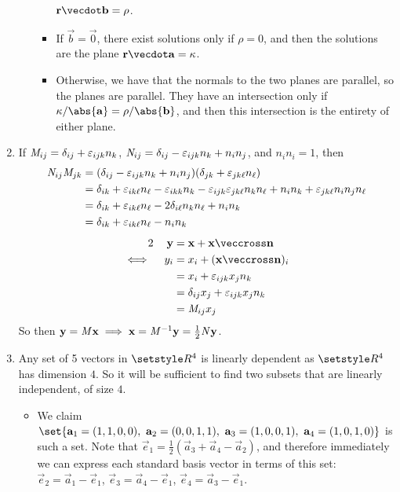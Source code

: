 \documentclass[fleqn,a4paper,11pt]{article}
\begin{document}
\begin{enumerate}[label=\textbf{\arabic*.}]
\begin{enumerate}[label=(\alph*)]
\begin{itemize}
       \(\vec r \vecdot \vec b = \rho\).
      \item
       If \(\vec b = \vec 0\), there exist solutions only if
       \(\rho = 0\), and then the solutions are the plane
       \(\vec r \vecdot \vec a = \kappa\).
      \item
       Otherwise, we have that the normals to the two planes are parallel, so
       the planes are parallel. They have an intersection only if
       \(\kappa / \abs{\vec a} = \rho / \abs{\vec b}\), and then this
       intersection is the entirety of either plane.
     \end{itemize}
   \end{enumerate}
  \item
   If \(\mathit{M}_{ij} = \delta_{ij} + \varepsilon_{ijk} n_k\),
   \(\mathit{N}_{ij} = \delta_{ij} - \varepsilon_{ijk} n_k + n_i n_j\), and
   \(n_i n_i = 1\), then
   \begin{align*}
    \mathit{N}_{ij} \mathit{M}_{jk}
     &= (\delta_{ij} - \varepsilon_{ijk} n_k + n_i n_j)
        (\delta_{jk} + \varepsilon_{jk\ell} n_\ell) \\
     &= \delta_{ik} + \varepsilon_{ik\ell} n_\ell
        - \varepsilon_{ikk} n_k - \varepsilon_{ijk} \varepsilon_{jk\ell} n_k n_\ell
        + n_i n_k + \varepsilon_{jk\ell} n_i n_j n_\ell \\
     &= \delta_{ik} + \varepsilon_{ik\ell} n_\ell
        - 2\delta_{i\ell} n_k n_\ell + n_i n_k \\
     &= \delta_{ik} + \varepsilon_{ik\ell} n_\ell - n_i n_k \\
   \end{align*}
   \begin{alignat*}2
    && \vec y &= \vec x + \vec x \veccross \vec n \\
    \iff{}&& y_i &= x_i + (\vec x \veccross \vec n)_i \\
    &&           &= x_i + \epsilon_{ijk} x_j n_k \\
    &&           &= \delta_{ij} x_j + \epsilon_{ijk} x_j n_k \\
    &&           &= \mat M_{ij} x_j
   \end{alignat*}
   So then \(\mathrm{\mathbf{y}} = \mathit{M} \mathrm{\mathbf{x}} \implies
    \mathrm{\mathbf{x}} = \mathit{M}^{-1} \mathrm{\mathbf{y}} = \frac 12 \mathit{N} \mathrm{\mathbf{y}}\).
   \item
    Any set of 5 vectors in \(\Reals^4\) is linearly dependent as
    \(\Reals^4\) has dimension \(4\). So it will be sufficient to find two
    subsets that are linearly independent, of size \(4\).
    \begin{itemize}
     \item
      We claim
      \(\set{\vec a_1 = (1, 1, 0, 0),\ \vec a_2 = (0, 0, 1, 1),
           \ \vec a_3 = (1, 0, 0, 1),\ \vec a_4 = (1, 0, 1, 0)}\)
      is such a set. Note that
      \(\vec e_1 = \frac 12 (\vec a_3 + \vec a_4 - \vec a_2)\), and therefore
      immediately we can express each standard basis vector in terms of this
      set:
      \(\vec e_2 = \vec a_1 - \vec e_1\),
      \(\vec e_3 = \vec a_4 - \vec e_1\),
      \(\vec e_4 = \vec a_3 - \vec e_1\).


\end{itemize}
\end{enumerate}
\end{document}
